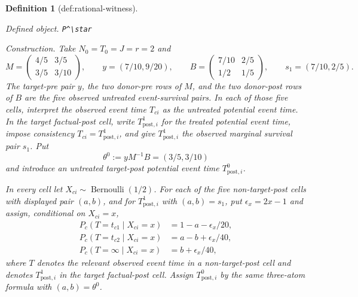 \documentclass{article}
\newtheorem{definition}{Definition}
\begin{document}
\begin{definition}[def:rational-witness]\label{def:rational-witness}
\par\smallskip\noindent\emph{Defined object.} \texttt{P\textasciicircum{}\textbackslash{}\allowbreak{}star}
\par\smallskip\noindent\emph{Construction.} Take \(N_0=T_0=J=r=2\) and
\[
M=\begin{pmatrix}4/5&3/5\\3/5&3/10\end{pmatrix},\qquad
y=(7/10,9/20),\qquad
B=\begin{pmatrix}7/10&2/5\\1/2&1/5\end{pmatrix},\qquad
s_1=(7/10,2/5).
\]
The target-pre pair \(y\), the two donor-pre rows of \(M\), and the two donor-post rows of \(B\) are the five observed untreated event-survival pairs.  In each of those five cells, interpret the observed event time \(T_{ci}\) as the untreated potential event time.  In the target factual-post cell, write \(T^{1}_{\mathrm{post},i}\) for the treated potential event time, impose consistency \(T_{ci}=T^{1}_{\mathrm{post},i}\), and give \(T^{1}_{\mathrm{post},i}\) the observed marginal survival pair \(s_1\).  Put
\[
\theta^0:=yM^{-1}B=(3/5,3/10)
\]
and introduce an untreated target-post potential event time \(T^{0}_{\mathrm{post},i}\).

In every cell let \(X_{ci}\sim\operatorname{Bernoulli}(1/2)\).  For each of the five non-target-post cells with displayed pair \((a,b)\), and for \(T^{1}_{\mathrm{post},i}\) with \((a,b)=s_1\), put \(\epsilon_x=2x-1\) and assign, conditional on \(X_{ci}=x\),
\[
\begin{aligned}
P_c(T=t_{c1}\mid X_{ci}=x)&=1-a-\epsilon_x/20,\\
P_c(T=t_{c2}\mid X_{ci}=x)&=a-b+\epsilon_x/40,\\
P_c(T=\infty\mid X_{ci}=x)&=b+\epsilon_x/40,
\end{aligned}
\]
where \(T\) denotes the relevant observed event time in a non-target-post cell and denotes \(T^{1}_{\mathrm{post},i}\) in the target factual-post cell.  Assign \(T^{0}_{\mathrm{post},i}\) by the same three-atom formula with \((a,b)=\theta^0\).


\end{definition}
\end{document}

